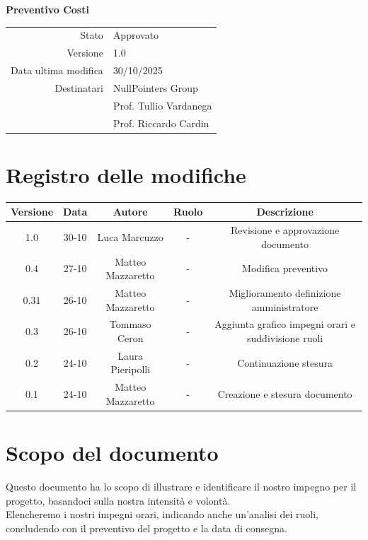 \documentclass{article}
\begin{document}
	\vspace{2cm}
	
	{
		\centering
		\Huge\bfseries Preventivo Costi\par
		\vspace{0.5cm}
	}
	
	\begin{center}
		\begin{tabular}{r|l}
			Stato & Approvato \\
			Versione & 1.0 \\
			Data ultima modifica & 30/10/2025 \\
			Destinatari & NullPointers Group \\
			& Prof. Tullio Vardanega \\
			& Prof. Riccardo Cardin \\
		\end{tabular}
	\end{center}
	
	\newpage
	\section{Registro delle modifiche}
	
	\begin{table}[htbp]
		\begin{tabular}{|c|c|c|c|c|}
			\hline
			\rowcolor[gray]{0.9}
			Versione & Data & Autore & Ruolo & Descrizione \\
			\hline
			1.0 & 30-10 & Luca Marcuzzo & - & Revisione e approvazione documento \\ 
			\hline
			0.4 & 27-10 & Matteo Mazzaretto & - & Modifica preventivo \\ 
			\hline
			0.31 & 26-10 & Matteo Mazzaretto & - & Miglioramento definizione amministratore \\ 
			\hline
			0.3 & 26-10 & Tommaso Ceron & - & Aggiunta grafico impegni orari e suddivisione ruoli \\ 
			\hline
			0.2 & 24-10 & Laura Pieripolli & - & Continuazione stesura \\ 
			\hline
			0.1 & 24-10 & Matteo Mazzaretto & - & Creazione e stesura documento \\ 
			\hline
		\end{tabular}
	\end{table}
	
	\newpage
	
	\section{Scopo del documento}
	Questo documento ha lo scopo di illustrare e identificare il nostro impegno per il progetto, basandoci sulla nostra intensità e volontà.\\
	Elencheremo i nostri impegni orari, indicando anche un'analisi dei ruoli, concludendo con il preventivo del progetto e la data di consegna.
	
\end{document}
